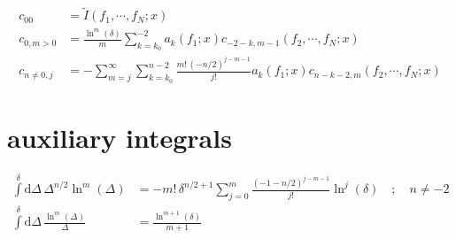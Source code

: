\documentclass[a4paper,10pt,fleqn]{scrartcl}
\begin{document}
    \begin{align*}
        c_{00}
        &=
        {\tilde I}(f_1,\cdots,f_N;x)
        \\
        c_{0,m>0}
        &=
        \frac{\ln^m(\delta)}{m}
        \sum\limits_{k=k_0}^{-2}
        a_k(f_1;x)
        c_{-2-k,m-1}(f_2,\cdots,f_N;x)
        \\
        c_{n\neq 0,j}
        &=
        -
        \sum_{m=j}^\infty
        \sum\limits_{k=k_0}^{n-2}
        \frac{m!\,(-n/2)^{j-m-1}}{j!}
        a_k(f_1;x)
        c_{n-k-2,m}(f_2,\cdots,f_N;x)
    \end{align*}

    \appendix
    \section{auxiliary integrals}
    \begin{align*}
        \int\limits^\delta \mathrm{d}\Delta\,
        \Delta^{n/2}
        \ln^m(\Delta)
        &=
        -m!\,
        \delta^{n/2+1}
        \sum\limits_{j=0}^m
        \frac{(-1-n/2)^{j-m-1}}{j!}
        \ln^j(\delta)
        \quad;\quad n\neq-2
        \\
        \int\limits^{\delta} \mathrm{d}\Delta\,
        \frac{\ln^m(\Delta)}{\Delta}
        &=
        \frac{\ln^{m+1}(\delta)}{m+1}
    \end{align*}
\end{document}
